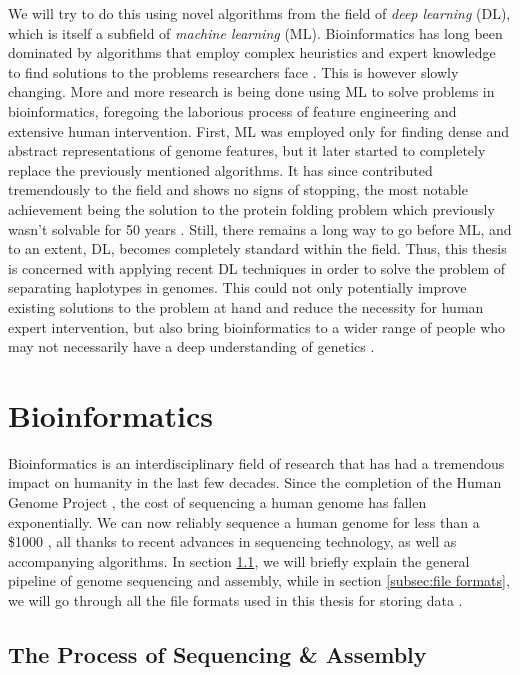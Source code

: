 \documentclass[times, utf8, diplomski, english]{fer_eng}
\begin{document}
We will try to do this using novel algorithms from the field of \textit{deep learning} (DL), which is itself a subfield of \textit{machine learning} (ML). Bioinformatics has long been dominated by algorithms that employ complex heuristics and expert knowledge to find solutions to the problems researchers face \cite{compeau_pevzner_2015}. This is however slowly changing. More and more research is being done using ML to solve problems in bioinformatics, foregoing the laborious process of feature engineering and extensive human intervention. First, ML was employed only for finding dense and abstract representations of genome features, but it later started to completely replace the previously mentioned algorithms. It has since contributed tremendously to the field and shows no signs of stopping, the most notable achievement being the solution to the protein folding problem which previously wasn't solvable for 50 years \cite{alphafold}. Still, there remains a long way to go before ML, and to an extent, DL, becomes completely standard within the field. Thus, this thesis is concerned with applying recent DL techniques in order to solve the problem of separating haplotypes in genomes. This could not only potentially improve existing solutions to the problem at hand and reduce the necessity for human expert intervention, but also bring bioinformatics to a wider range of people who may not necessarily have a deep understanding of genetics \cite{dl_bioinformatics}.

\section{Bioinformatics}

Bioinformatics is an interdisciplinary field of research that has had a tremendous impact on humanity in the last few decades. Since the completion of the Human Genome Project \cite{HGP1} \cite{HGP2}, the cost of sequencing a human genome has fallen exponentially. We can now reliably sequence a human genome for less than a \$1000 \cite{genome_cost}, all thanks to recent advances in sequencing technology, as well as accompanying algorithms. In section \ref{subsec:the process of sequencing and assembly}, we will briefly explain the general pipeline of genome sequencing and assembly, while in section \ref{subsec:file formats}, we will go through all the file formats used in this thesis for storing data	.

\subsection{The Process of Sequencing \& Assembly}
\label{subsec:the process of sequencing and assembly}
\end{document}
